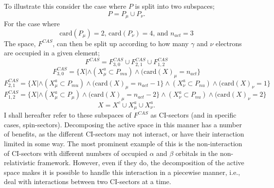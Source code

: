 \noindent To illustrate this consider the case where $P$ is split into two subspaces;
\begin{equation}
P = P_{\mu} \cup  P_{\nu}.
\end{equation}
For the case where
\begin{equation*}
\text{card}(P_{\mu}) = 2 
\text{, \ \ \ }
\text{card}(P_{\nu}) = 4
\text{, \ \ \ and \ \ \ }
n_{act} = 3
\end{equation*}
\noindent The space, $F^{CAS}$, can then be split up according to how many $\gamma$ and $\nu$
electrons are occupied in a given element;
\begin{equation*}
F^{CAS} = F^{CAS}_{3,0} \cup F^{CAS}_{2,1} \cup F^{CAS}_{1,2} 
\end{equation*}
\begin{equation*}
F^{CAS}_{3,0} = \{ X | \wedge (X^{a}_{\mu} \subset P_{mu}) \wedge ( \text{card}(X)_{\mu} = n_{act} \}
\end{equation*}
\begin{equation*}
F^{CAS}_{2,1} = \{ X | \wedge (X^{a}_{\mu} \subset P_{mu}) \wedge ( \text{card}(X)_{\mu} = n_{act}-1 \}
                       \wedge (X^{a}_{\nu} \subset P_{nu}) \wedge ( \text{card}(X)_{\nu} = 1 \}
\end{equation*}
\begin{equation*}
F^{CAS}_{1,2} = \{ X | \wedge (X^{a}_{\mu} \subset P_{\mu}) \wedge ( \text{card}(X)_{\mu} = n_{act}-2 \}
                       \wedge (X^{a}_{\nu} \subset P_{nu}) \wedge ( \text{card}(X)_{\nu} = 2 \}
\end{equation*}
\begin{equation*}
X = X^{c} \cup X^{a}_{\mu} \cup X^{a}_{\nu}.
\end{equation*}
\noindent I shall hereafter refer to these subspaces of $F^{CAS}$ as
CI-sectors (and in specific cases, spin-sectors). Decomposing the active space in
this manner has a number of benefits, as the different CI-sectors may not interact,
or have their interaction limited in some way.
The most prominent example of this is the non-interaction
of CI-sectors with different numbers of occupied $\alpha$ and $\beta$ orbitals 
in the non-relativistic framework.  However, even if they do,
the decomposition of the active space makes it is possible to handle
this interaction in a piecewise manner, i.e., deal with interactions
between two CI-sectors at a time.

